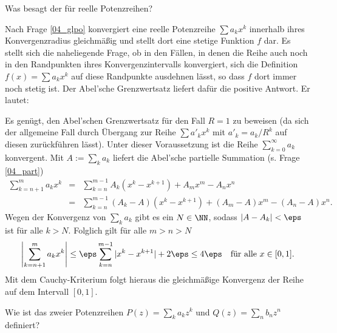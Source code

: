 \begin{frage}\label{04_abel}
Was besagt der  für reelle Potenzreihen?
\end{frage}

\begin{antwort}
Nach Frage \ref{04_glpo} konvergiert eine reelle Potenzreihe 
$\sum a_kx^k$ innerhalb ihres Konvergenzradius gleichmäßig 
und stellt dort eine stetige Funktion $f$
dar. Es stellt sich die naheliegende Frage, ob in den 
Fällen, in denen die Reihe auch noch in den Randpunkten 
ihres Konvergenzintervalls konvergiert, sich die Definition 
$f(x)=\sum a_kx^k$ auf diese Randpunkte ausdehnen lässt, so dass 
$f$ dort immer noch stetig ist. Der Abel'sche Grenzwertsatz liefert 
dafür die positive Antwort. Er lautet:

\medskip
\noindent{}
 
\medskip\noindent
Es genügt, den Abel'schen Grenzwertsatz für den Fall $R=1$ zu beweisen 
(da sich der allgemeine Fall durch Übergang zur Reihe $\sum a'_k x^k$ 
mit $a'_k=a_k/R^k$ auf diesen zurückführen lässt).  
Unter dieser Voraussetzung ist die Reihe $\sum_{k=0}^\infty a_k$ konvergent. 
Mit $A:= \sum_k a_k$ liefert die Abel'sche partielle Summation 
(s. Frage \ref{04_part}) 
\begin{eqnarray*}
\sum_{k=n+1}^m a_k x^k &=&
\sum_{k=n}^{m-1} A_k( x^k -x^{k+1} ) + A_m x^m - A_n x^n \\
&=&
\sum_{k=n}^{m-1} (A_k-A)(x^k-x^{k+1}) + (A_m-A)x^m - (A_n-A)x^n. 
\end{eqnarray*}
Wegen der Konvergenz von $\sum_k a_k$ gibt es ein $N\in\NN$, sodass  
$|A-A_k|<\eps$ ist für alle $k>N$. Folglich gilt für alle $m>n>N$
\[
\left| \sum_{k=n+1}^m a_k x^k \right|  \le 
\eps \sum_{k=n}^{m-1} |x^k-x^{k+1}| +2 \eps \le 4\eps 
\quad\text{für alle $x\in [0,1]$.}
\] 
Mit dem Cauchy-Kriterium folgt hieraus die gleichmäßige Konvergenz der 
Reihe auf dem Intervall $[0,1]$.
\AntEnd
\end{antwort}

\begin{frage}\label{04_caup}
Wie ist das  zweier Potenzreihen 
$P(z)=\sum_k a_k z^k$ und $Q(z)=\sum_n b_n z^n$ definiert?
\end{frage}

